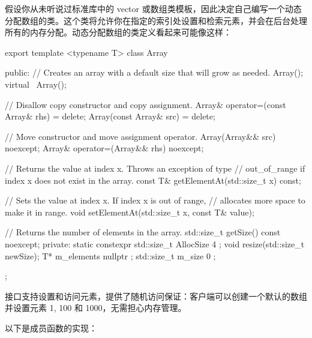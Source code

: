 
假设你从未听说过标准库中的 vector 或数组类模板，因此决定自己编写一个动态分配数组的类。这个类将允许你在指定的索引处设置和检索元素，并会在后台处理所有的内存分配。动态分配数组的类定义看起来可能像这样：

\begin{cpp}
export template <typename T>
class Array
{
    public:
        // Creates an array with a default size that will grow as needed.
        Array();
        virtual ~Array();

        // Disallow copy constructor and copy assignment.
        Array& operator=(const Array& rhs) = delete;
        Array(const Array& src) = delete;

        // Move constructor and move assignment operator.
        Array(Array&& src) noexcept;
        Array& operator=(Array&& rhs) noexcept;

        // Returns the value at index x. Throws an exception of type
        // out_of_range if index x does not exist in the array.
        const T& getElementAt(std::size_t x) const;

        // Sets the value at index x. If index x is out of range,
        // allocates more space to make it in range.
        void setElementAt(std::size_t x, const T& value);

        // Returns the number of elements in the array.
        std::size_t getSize() const noexcept;
    private:
        static constexpr std::size_t AllocSize { 4 };
        void resize(std::size_t newSize);
        T* m_elements { nullptr };
        std::size_t m_size { 0 };
};
\end{cpp}

接口支持设置和访问元素，提供了随机访问保证：客户端可以创建一个默认的数组并设置元素 1, 100 和 1000，无需担心内存管理。

以下是成员函数的实现：

